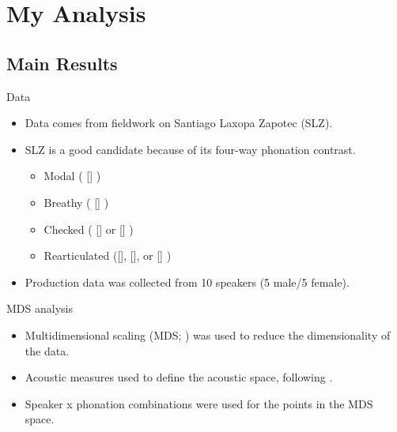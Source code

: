 \documentclass{beamer}
\begin{document}
\section{My Analysis}
\subsection{Main Results}
\begin{frame}{Data}
  \begin{itemize}
    \item Data comes from fieldwork on Santiago Laxopa Zapotec (SLZ).
    \item SLZ is a good candidate because of its four-way phonation contrast.
    \begin{itemize}
      \item Modal ( [] )
      \item Breathy ( [] )
      \item Checked ( [] or [] )
      \item Rearticulated ([], [], or [] )
    \end{itemize}
    \item Production data was collected from 10 speakers (5 male/5 female).
  \end{itemize}
\end{frame}

\begin{frame}{MDS analysis}
  \begin{itemize}
    \item Multidimensional scaling (MDS; \cite{kruskalMultidimensionalScaling1978}) was used to reduce the dimensionality of the data.
    \item Acoustic measures used to define the acoustic space, following \citet{keatingCrosslanguageAcousticSpace2023}.
    \item Speaker x phonation combinations were used for the points in the MDS space.
  \end{itemize}
\end{frame}
\end{document}
